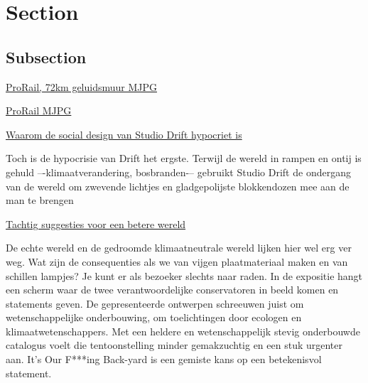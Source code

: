 
\section{Section}


    \subsection{Subsection}\label{subsec:subsection}

        \href{https://www.mjpgspoor.nl/}{ProRail, 72km
        geluidsmuur MJPG}

        \href{https://www.prorail.nl/programmas/mjpg}{ProRail MJPG}




        \href{https://www.nrc.nl/nieuws/2022/09/13/waarom-de-social-design-van-studio-drift-hypocriet-is-2-a4141699}
        {Waarom de social design van Studio Drift hypocriet is}

        \begin{displayquote}
            Toch is de hypocrisie van Drift het ergste.
            Terwijl de wereld in rampen en ontij is gehuld
            –-klimaatverandering, bosbranden-–
            gebruikt Studio Drift de ondergang van de wereld
            om zwevende lichtjes en gladgepolijste blokkendozen mee aan de man te brengen
        \end{displayquote}

        \href{https://www.nrc.nl/nieuws/2022/06/13/tachtig-suggesties-voor-een-betere-wereld-2-a4133270}
        {Tachtig suggesties voor een betere wereld}

        \begin{displayquote}
            De echte wereld en de gedroomde klimaatneutrale wereld lijken hier wel erg ver weg.
            Wat zijn de consequenties als we van vijgen plaatmateriaal maken en van schillen lampjes?
            Je kunt er als bezoeker slechts naar raden.
            In de expositie hangt een scherm waar de twee verantwoordelijke conservatoren
            in beeld komen en statements geven.
            De gepresenteerde ontwerpen schreeuwen juist om wetenschappelijke
            onderbouwing, om toelichtingen door ecologen en klimaatwetenschappers.
            Met een heldere en wetenschappelijk stevig onderbouwde catalogus voelt
            die tentoonstelling minder gemakzuchtig en een stuk urgenter aan.
            It’s Our F***ing Back-yard is een gemiste kans op een betekenisvol statement.
        \end{displayquote}

